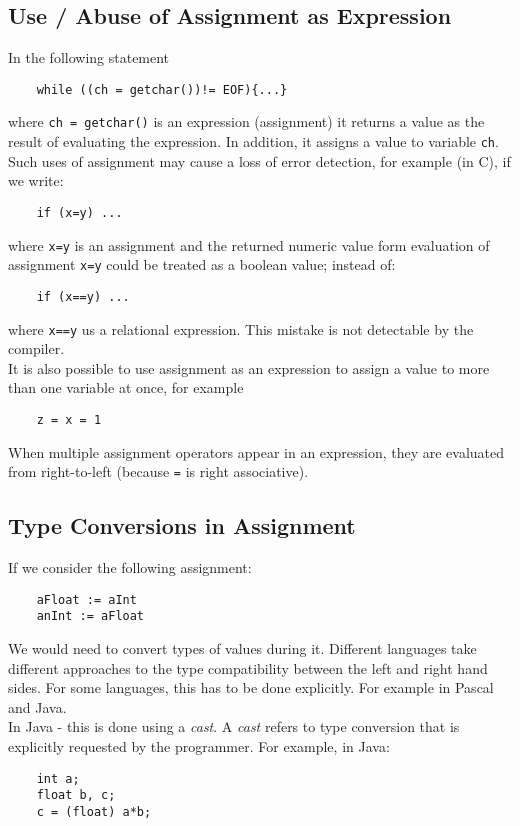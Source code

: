 \subsection{Use / Abuse of Assignment as Expression}
In the following statement
\begin{verbatim}
    while ((ch = getchar())!= EOF){...}
\end{verbatim}
where \verb|ch = getchar()| is an expression (assignment) it returns a value as the result of evaluating the expression. In addition, it assigns a value to variable \verb|ch|. Such uses of assignment may cause a loss of error detection, for example (in C), if we write:
\begin{verbatim}
    if (x=y) ...
\end{verbatim}
where \verb|x=y| is an assignment and the returned numeric value form evaluation of assignment \verb|x=y| could be treated as a boolean value; instead of:
\begin{verbatim}
    if (x==y) ...
\end{verbatim}
where \verb|x==y| us a relational expression. This mistake is not detectable by the compiler. \\

It is also possible to use assignment as an expression to assign a value to more than one variable at once, for example
\begin{verbatim}
    z = x = 1
\end{verbatim}

When multiple assignment operators appear in an expression, they are evaluated from right-to-left (because \verb|=| is right associative). 

\subsection{Type Conversions in Assignment}
If we consider the following assignment:
\begin{verbatim}
    aFloat := aInt
    anInt := aFloat
\end{verbatim}
We would need to convert types of values during it. Different languages take different approaches to the type compatibility between the left and right hand sides. For some languages, this has to be done explicitly. For example in Pascal and Java.\\

In Java - this is done using a \textit{cast}. A \textit{cast} refers to type conversion that is explicitly requested by the programmer. For example, in Java:
\begin{verbatim}
    int a;
    float b, c;
    c = (float) a*b;
\end{verbatim}

